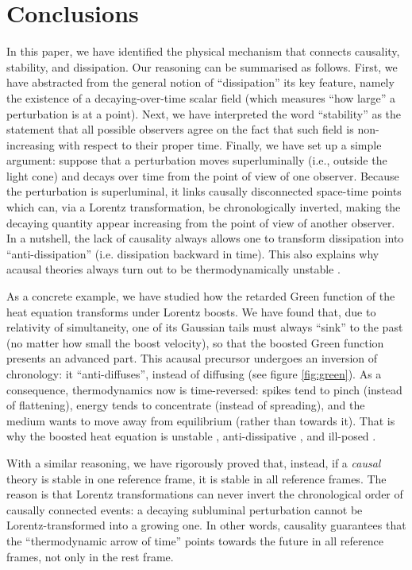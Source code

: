 \documentclass[a4paper, amsfonts, amssymb, amsmath, reprint, showkeys,  twoside, onecolumn,notitlepage,nofootinbib]{revtex4-1}
\theoremstyle{definition}
\theoremstyle{theorem}
\begin{document}
\section{Conclusions}


In this paper, we have identified the physical mechanism that connects causality, stability, and dissipation. Our reasoning can be summarised as follows. First, we have abstracted from the general notion of ``dissipation'' its key feature, namely the existence of a decaying-over-time scalar field (which measures ``how large'' a perturbation is at a point). Next, we have interpreted the word ``stability'' as the statement that all possible observers agree on the fact that such field is non-increasing with respect to their proper time. Finally, we have set up a simple argument: suppose that a perturbation moves superluminally (i.e., outside the light cone) and decays over time from the point of view of one observer. Because the perturbation is superluminal, it links causally disconnected space-time points which can, via a Lorentz transformation,
be chronologically inverted, making the decaying quantity appear increasing from the point of view
of another observer. In a nutshell, the lack of causality always allows one to transform dissipation
into ``anti-dissipation'' (i.e. dissipation backward in time). This also explains why acausal theories always turn out to be thermodynamically unstable \cite{GavassinoCausality2021}. 



As a concrete example, we have studied how the retarded Green function of the heat equation transforms under Lorentz boosts. We have found that, due to relativity of simultaneity, one of  its Gaussian tails must always ``sink'' to the past (no matter how small the boost velocity), so that the boosted Green function presents an advanced part. This acausal precursor undergoes an inversion of chronology: it ``anti-diffuses'', instead of diffusing (see figure \ref{fig:green}). As a consequence, thermodynamics now is time-reversed: spikes tend to pinch (instead of flattening), energy tends to concentrate (instead of spreading), and the medium wants to move away from equilibrium (rather than towards it). That is why the boosted heat equation is unstable \cite{Hiscock_Insatibility_first_order}, anti-dissipative \cite{GavassinoUEIT2021}, and ill-posed \cite{Kost2000}. 


With a similar reasoning, we have rigorously proved that, instead, if a \textit{causal} theory is stable in one reference frame, it is stable in all reference frames. The reason is that Lorentz transformations can never invert the chronological order of causally connected events: a decaying subluminal perturbation cannot be Lorentz-transformed into a growing one. In other words, causality guarantees that the ``thermodynamic arrow of time'' points towards the future in all reference frames, not only in the rest frame. 
\end{document}
